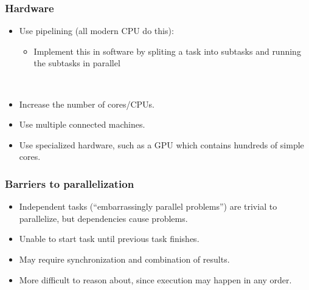 \begin{frame}
  \frametitle{Hardware}

\hspace*{.2\textwidth}\begin{minipage}{.76\textwidth}
  \begin{itemize}
    \item Use pipelining (all modern CPU do this):
      \begin{itemize}
        \item Implement this in software by spliting a task into subtasks and
              running the subtasks in parallel
      \end{itemize}
    ~\\[1em]
    \item Increase the number of cores/CPUs.
    ~\\[1em]
    \item Use multiple connected machines.
    ~\\[1em]
    \item Use specialized hardware, such as a GPU which contains hundreds of
          simple cores.
  \end{itemize}
\end{minipage}

\end{frame}

\begin{frame}
  \frametitle{Barriers to parallelization}

\hspace*{.1\textwidth}\begin{minipage}{.85\textwidth}
  \begin{itemize}
    \item Independent tasks (``embarrassingly parallel problems'') are
      trivial to parallelize, but dependencies cause problems.\\[1em]
    \item Unable to start task until previous task finishes.\\[1em]
    \item May require synchronization and combination of results.\\[1em]
    \item More difficult to reason about, since execution may happen in any
          order.
  \end{itemize}
\end{minipage}

\end{frame}

